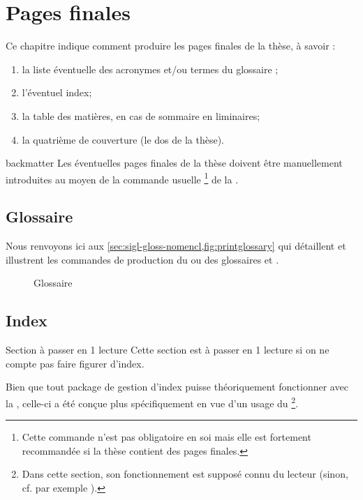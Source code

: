 \chapter{Pages finales}
\label{cha:pages-finales}

Ce chapitre indique comment produire les pages finales de la thèse,
à savoir :
\begin{enumerate}
\item la liste éventuelle des acronymes et/ou
  termes du glossaire ;
\item l'éventuel index;
\item la table des matières, en cas de sommaire en \glspl{liminaire};
\item la quatrième de couverture (le dos de la thèse).
\end{enumerate}

\begin{docCommand}{backmatter}{}
  Les éventuelles pages finales de la thèse doivent être manuellement
  introduites au moyen de la commande usuelle
  \footnote{Cette commande n'est pas obligatoire en
    soi mais elle est fortement recommandée si la thèse contient des pages
    finales.} de la \nofrontmatter.
\end{docCommand}

\section{Glossaire}

Nous renvoyons ici aux \vref{sec:sigl-gloss-nomencl,fig:printglossary} qui
détaillent et illustrent les commandes de production du ou des glossaires
 et .

\begin{figure}[htbp]
  \centering
  \caption{Glossaire}
  \label{fig:printglossary}
\end{figure}

\section{Index}

\begin{dbremark*}{Section à passer en 1\iere{} lecture}
  Cette section est à passer en 1\iere{} lecture si on ne compte pas faire
  figurer d'index.
\end{dbremark*}

Bien que tout package de gestion d'index puisse théoriquement fonctionner avec
la \yatcl, celle-ci a été conçue plus spécifiquement en vue d'un usage du
\footnote{Dans cette section, son fonctionnement est supposé
  connu du lecteur (sinon, cf. par exemple \cite{en-ligne7}).}.

